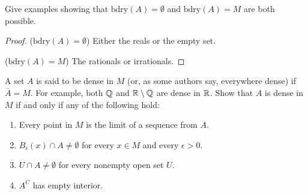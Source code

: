 \begin{exercise}{45}
Give examples showing that $\text{bdry}(A)=\emptyset$ and $\text{bdry}(A)=M$ are both possible.
\end{exercise}
\begin{proof}
($\text{bdry}(A)=\emptyset$)
Either the reals or the empty set.

($\text{bdry}(A)=M$)
The rationals or irrationals.
\end{proof} 

\begin{exercise}{46}
A set $A$ is said to be dense in $M$ (or, as some authors say, everywhere dense) if $\bar{A}=M$. For example, both $\mathbb{Q}$ and $\mathbb{R}\setminus\mathbb{Q}$ are dense in $\mathbb{R}$. Show that $A$ is dense in $M$ if and only if any of the following hold:
\begin{enumerate}
    \item Every point in $M$ is the limit of a sequence from $A$.
    \item $B_\epsilon(x)\cap A\neq\emptyset$ for every $x\in M$ and every $\epsilon>0$.
    \item $U\cap A\neq\emptyset$ for every nonempty open set $U$.
    \item $A^C$ has empty interior.
\end{enumerate}
\end{exercise}
